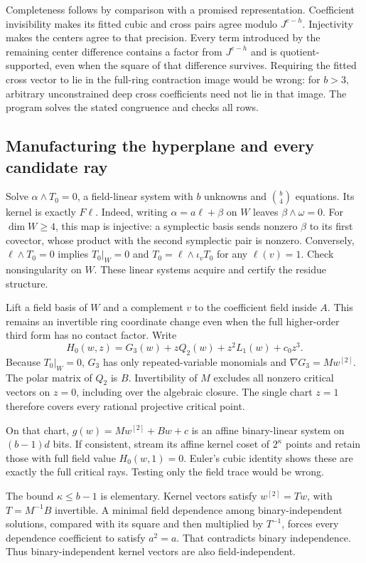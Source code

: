 Completeness follows by comparison with a promised representation.
Coefficient invisibility makes its fitted cubic and cross pairs agree
modulo $J^{e-h}$. Injectivity makes the centers agree to that precision.
Every term introduced by the remaining center difference contains a
factor from $J^{e-h}$ and is quotient-supported, even when the square
of that difference survives. Requiring the fitted cross vector to lie
in the full-ring contraction image would be wrong: for $b>3$, arbitrary
unconstrained deep cross coefficients need not lie in that image.
The program solves the stated congruence and checks all rows.

\subsection{Manufacturing the hyperplane and every candidate ray}
Solve $\alpha\wedge T_0=0$, a field-linear system with $b$ unknowns and
$\binom b4$ equations. Its kernel is exactly $F\ell$. Indeed, writing
$\alpha=a\ell+\beta$ on $W$ leaves $\beta\wedge\omega=0$.
For $\dim W\ge4$, this map is injective: a symplectic basis sends nonzero
$\beta$ to its first covector, whose product with the second symplectic
pair is nonzero. Conversely, $\ell\wedge T_0=0$ implies $T_0|_W=0$ and
$T_0=\ell\wedge\iota_vT_0$ for any $\ell(v)=1$. Check nonsingularity
on $W$. These linear systems acquire and certify the residue structure.

Lift a field basis of $W$ and a complement $v$ to the coefficient field
inside $A$. This remains an invertible ring coordinate change even when
the full higher-order third form has no contact factor. Write
\[
 H_0(w,z)=G_3(w)+zQ_2(w)+z^2L_1(w)+c_0z^3.
\]
Because $T_0|_W=0$, $G_3$ has only repeated-variable monomials and
$\nabla G_3=Mw^{[2]}$. The polar matrix of $Q_2$ is $B$.
Invertibility of $M$ excludes all nonzero critical vectors on $z=0$,
including over the algebraic closure. The single chart $z=1$ therefore
covers every rational projective critical point.

On that chart, $g(w)=Mw^{[2]}+Bw+c$ is an affine binary-linear system
on $(b-1)d$ bits. If consistent, stream its affine kernel coset of
$2^\kappa$ points and retain those with full field value $H_0(w,1)=0$.
Euler's cubic identity shows these are exactly the full critical rays.
Testing only the field trace would be wrong.

The bound $\kappa\le b-1$ is elementary. Kernel vectors satisfy
$w^{[2]}=Tw$, with $T=M^{-1}B$ invertible. A minimal field dependence
among binary-independent solutions, compared with its square and then
multiplied by $T^{-1}$, forces every dependence coefficient to satisfy
$a^2=a$. That contradicts binary independence. Thus binary-independent
kernel vectors are also field-independent.

